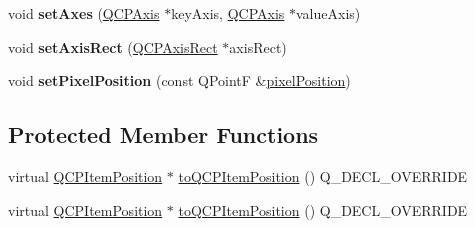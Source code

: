 \begin{DoxyCompactItemize}
\item 
void {\bfseries set\+Axes} (\hyperlink{class_q_c_p_axis}{Q\+C\+P\+Axis} $\ast$key\+Axis, \hyperlink{class_q_c_p_axis}{Q\+C\+P\+Axis} $\ast$value\+Axis)\hypertarget{class_q_c_p_item_position_a2185f45c75ac8cb9be89daeaaad50e37}{}\label{class_q_c_p_item_position_a2185f45c75ac8cb9be89daeaaad50e37}

\item 
void {\bfseries set\+Axis\+Rect} (\hyperlink{class_q_c_p_axis_rect}{Q\+C\+P\+Axis\+Rect} $\ast$axis\+Rect)\hypertarget{class_q_c_p_item_position_a0cd9b326fb324710169e92e8ca0041c2}{}\label{class_q_c_p_item_position_a0cd9b326fb324710169e92e8ca0041c2}

\item 
void {\bfseries set\+Pixel\+Position} (const Q\+PointF \&\hyperlink{class_q_c_p_item_position_a247e99435d88ddd73c08fad3aebd4e8d}{pixel\+Position})\hypertarget{class_q_c_p_item_position_a8d4f858f2089973967cf9cb81970ef0a}{}\label{class_q_c_p_item_position_a8d4f858f2089973967cf9cb81970ef0a}

\end{DoxyCompactItemize}
\subsection*{Protected Member Functions}
\begin{DoxyCompactItemize}
\item 
virtual \hyperlink{class_q_c_p_item_position}{Q\+C\+P\+Item\+Position} $\ast$ \hyperlink{class_q_c_p_item_position_a008ff9ebe645a963671b68bcf7f7a1c0}{to\+Q\+C\+P\+Item\+Position} () Q\+\_\+\+D\+E\+C\+L\+\_\+\+O\+V\+E\+R\+R\+I\+DE
\item 
virtual \hyperlink{class_q_c_p_item_position}{Q\+C\+P\+Item\+Position} $\ast$ \hyperlink{class_q_c_p_item_position_a008ff9ebe645a963671b68bcf7f7a1c0}{to\+Q\+C\+P\+Item\+Position} () Q\+\_\+\+D\+E\+C\+L\+\_\+\+O\+V\+E\+R\+R\+I\+DE
\end{DoxyCompactItemize}
